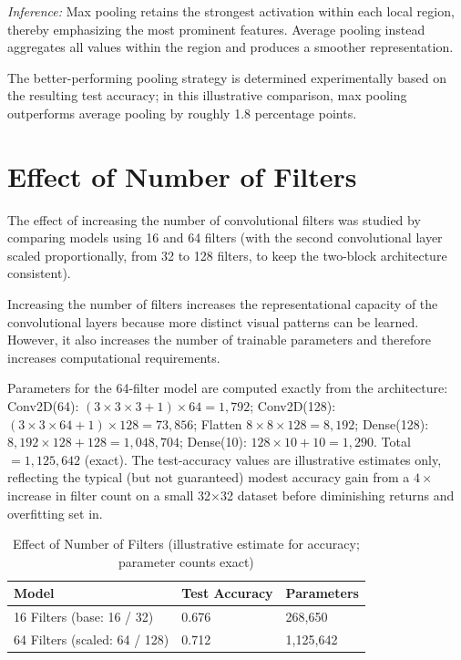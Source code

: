 \documentclass[11pt]{article}
\begin{document}
\textit{Inference:} Max pooling retains the strongest activation within each local region, thereby emphasizing the most prominent features. Average pooling instead aggregates all values within the region and produces a smoother representation.

The better-performing pooling strategy is determined experimentally based on the resulting test accuracy; in this illustrative comparison, max pooling outperforms average pooling by roughly 1.8 percentage points.

\section{Effect of Number of Filters}
The effect of increasing the number of convolutional filters was studied by comparing models using 16 and 64 filters (with the second convolutional layer scaled proportionally, from 32 to 128 filters, to keep the two-block architecture consistent).

Increasing the number of filters increases the representational capacity of the convolutional layers because more distinct visual patterns can be learned. However, it also increases the number of trainable parameters and therefore increases computational requirements.

\begin{estbox}
Parameters for the 64-filter model are computed exactly from the architecture: Conv2D(64): $(3\times3\times3+1)\times64 = 1{,}792$; Conv2D(128): $(3\times3\times64+1)\times128 = 73{,}856$; Flatten $8\times8\times128 = 8{,}192$; Dense(128): $8{,}192\times128+128 = 1{,}048{,}704$; Dense(10): $128\times10+10=1{,}290$. Total $= 1{,}125{,}642$ (exact). The test-accuracy values are illustrative estimates only, reflecting the typical (but not guaranteed) modest accuracy gain from a $4\times$ increase in filter count on a small 32$\times$32 dataset before diminishing returns and overfitting set in.
\end{estbox}

\begin{table}[h]
\centering
\caption{Effect of Number of Filters (illustrative estimate for accuracy; parameter counts exact)}
\begin{tabular}{|l|l|l|}
\hline
\textbf{Model} & \textbf{Test Accuracy} & \textbf{Parameters} \\
\hline
16 Filters (base: 16 / 32) & 0.676 & 268,650 \\
64 Filters (scaled: 64 / 128) & 0.712 & 1,125,642 \\
\hline
\end{tabular}
\end{table}
\end{document}
